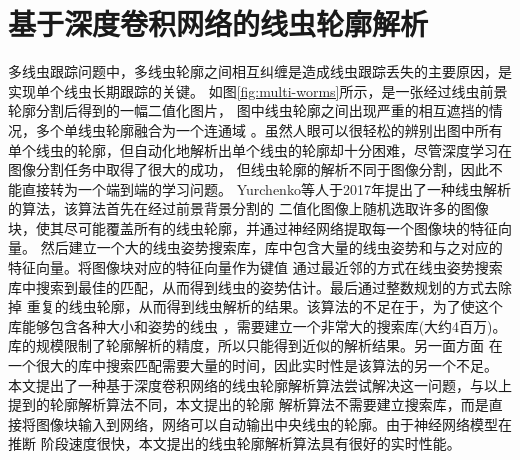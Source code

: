 \section{基于深度卷积网络的线虫轮廓解析}
	多线虫跟踪问题中，多线虫轮廓之间相互纠缠是造成线虫跟踪丢失的主要原因，是实现单个线虫长期跟踪的关键。
	如图\ref{fig:multi-worms}所示，是一张经过线虫前景轮廓分割后得到的一幅二值化图片，
	图中线虫轮廓之间出现严重的相互遮挡的情况，多个单线虫轮廓融合为一个连通域
	。虽然人眼可以很轻松的辨别出图中所有单个线虫的轮廓，但自动化地解析出单个线虫的轮廓却十分困难，尽管深度学习在图像分割任务中取得了很大的成功，
	但线虫轮廓的解析不同于图像分割，因此不能直接转为一个端到端的学习问题。
	Yurchenko等人\cite{yurchenko2017parsing}于2017年提出了一种线虫解析的算法，该算法首先在经过前景背景分割的
	二值化图像上随机选取许多的图像块，使其尽可能覆盖所有的线虫轮廓，并通过神经网络提取每一个图像块的特征向量。
	然后建立一个大的线虫姿势搜索库，库中包含大量的线虫姿势和与之对应的特征向量。将图像块对应的特征向量作为键值
	通过最近邻的方式在线虫姿势搜索库中搜索到最佳的匹配，从而得到线虫的姿势估计。最后通过整数规划的方式去除掉
	重复的线虫轮廓，从而得到线虫解析的结果。该算法的不足在于，为了使这个库能够包含各种大小和姿势的线虫
	，需要建立一个非常大的搜索库(大约4百万)。库的规模限制了轮廓解析的精度，所以只能得到近似的解析结果。另一面方面
	在一个很大的库中搜索匹配需要大量的时间，因此实时性是该算法的另一个不足。
	本文提出了一种基于深度卷积网络的线虫轮廓解析算法尝试解决这一问题，与以上提到的轮廓解析算法不同，本文提出的轮廓
	解析算法不需要建立搜索库，而是直接将图像块输入到网络，网络可以自动输出中央线虫的轮廓。由于神经网络模型在推断
	阶段速度很快，本文提出的线虫轮廓解析算法具有很好的实时性能。
